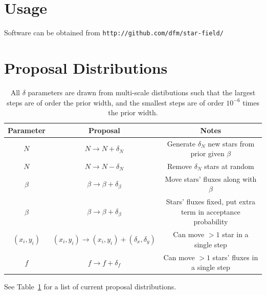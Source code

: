 \documentclass[manuscript]{aastex}
\begin{document}
\section{Usage}
Software can be obtained from {\tt http://github.com/dfm/star-field/}

\section{Proposal Distributions}

\begin{table}\footnotesize
\begin{center}
\begin{tabular}{|c|c|c|}
\hline
Parameter & Proposal & Notes\\
\hline
$N$ & $N \to N + \delta_N$ & Generate $\delta_N$ new stars from prior given
$\beta$\\
$N$ & $N \to N - \delta_N$ & Remove $\delta_N$ stars at random\\
$\beta$ & $\beta \to \beta + \delta_\beta$ & Move stars' fluxes along with
$\beta$\\
$\beta$ & $\beta \to \beta + \delta_\beta$ & Stars' fluxes fixed, put extra
term in acceptance probability \\
$(x_i,y_i)$ & $(x_i,y_i) \to (x_i,y_i)+(\delta_x, \delta_y)$ & Can move $>1$ star
in a single step \\
$f$ & $f \to f + \delta_f$ & Can move $>1$ stars' fluxes in a single step\\
\hline
\end{tabular}
\end{center}
\caption{All $\delta$ parameters are drawn from multi-scale distibutions such
that the largest steps are of order the prior width, and the smallest steps
are of order $10^{-6}$ times the prior width.\label{proposals}}
\end{table}

See Table~\ref{proposals} for a list of current proposal distributions.




\end{document}
